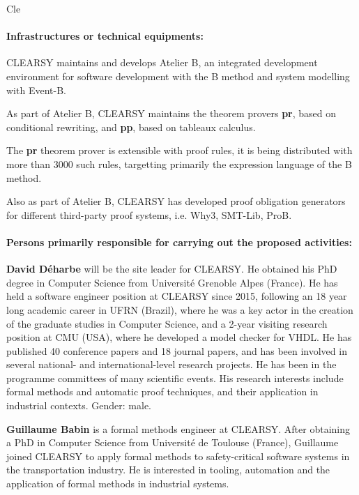 \begin{sitedescription}{Cle}
\paragraph*{Infrastructures or technical equipments:}

\begin{compactitem}
\item CLEARSY maintains and develops Atelier B, an integrated development environment for software development with the B method and system modelling with Event-B.
\item As part of Atelier B, CLEARSY maintains the theorem provers \textbf{pr}, based on conditional rewriting, and \textbf{pp}, based on tableaux calculus.
\item The \textbf{pr} theorem prover is extensible with proof rules, it is being distributed with more than 3000 such rules, targetting primarily the expression language of the B method.
\item Also as part of Atelier B, CLEARSY has developed proof obligation generators for different third-party proof systems, i.e. Why3, SMT-Lib, ProB.
\end{compactitem}

\paragraph*{Persons primarily responsible for carrying out the proposed activities:}

\begin{compactitem}
\item\textbf{David Déharbe} will be the site leader for CLEARSY. He obtained his PhD degree in Computer Science from Université Grenoble Alpes 
(France). He has held a software engineer position at CLEARSY since 2015, following an 18 year long academic career in UFRN (Brazil), 
where he was a key actor in the creation of the graduate studies in Computer Science, and a 2-year visiting research position at CMU 
(USA), where he developed a model checker for VHDL. He has published 40 conference papers and 18 journal papers, and has been involved 
in several national- and international-level research projects. He has been in the programme committees of many scientific events. His 
research interests include formal methods and automatic proof techniques, and their application in industrial contexts. Gender: male.

\item\textbf{Guillaume Babin} is a formal methods engineer at CLEARSY. After obtaining a PhD in Computer Science from Université de 
Toulouse (France), Guillaume joined CLEARSY to apply formal methods to safety-critical software systems in the transportation industry. 
He is interested in tooling, automation and the application of formal methods in industrial systems.


\end{compactitem}
\end{sitedescription}
